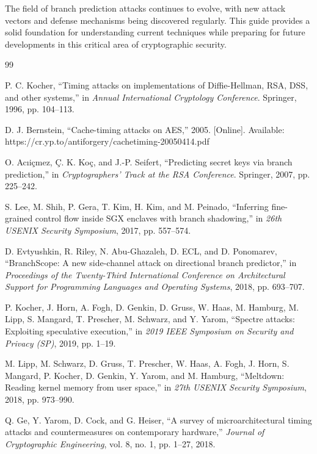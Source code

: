\documentclass[11pt,a4paper]{article}
\theoremstyle{definition}
\begin{document}
The field of branch prediction attacks continues to evolve, with new attack vectors and defense mechanisms being discovered regularly. This guide provides a solid foundation for understanding current techniques while preparing for future developments in this critical area of cryptographic security.

\newpage

\begin{thebibliography}{99}

P. C. Kocher, ``Timing attacks on implementations of Diffie-Hellman, RSA, DSS, and other systems,'' in \textit{Annual International Cryptology Conference}. Springer, 1996, pp. 104--113.

D. J. Bernstein, ``Cache-timing attacks on AES,'' 2005. [Online]. Available: https://cr.yp.to/antiforgery/cachetiming-20050414.pdf

O. Acıiçmez, Ç. K. Koç, and J.-P. Seifert, ``Predicting secret keys via branch prediction,'' in \textit{Cryptographers' Track at the RSA Conference}. Springer, 2007, pp. 225--242.

S. Lee, M. Shih, P. Gera, T. Kim, H. Kim, and M. Peinado, ``Inferring fine-grained control flow inside SGX enclaves with branch shadowing,'' in \textit{26th USENIX Security Symposium}, 2017, pp. 557--574.

D. Evtyushkin, R. Riley, N. Abu-Ghazaleh, D. ECL, and D. Ponomarev, ``BranchScope: A new side-channel attack on directional branch predictor,'' in \textit{Proceedings of the Twenty-Third International Conference on Architectural Support for Programming Languages and Operating Systems}, 2018, pp. 693--707.

P. Kocher, J. Horn, A. Fogh, D. Genkin, D. Gruss, W. Haas, M. Hamburg, M. Lipp, S. Mangard, T. Prescher, M. Schwarz, and Y. Yarom, ``Spectre attacks: Exploiting speculative execution,'' in \textit{2019 IEEE Symposium on Security and Privacy (SP)}, 2019, pp. 1--19.

M. Lipp, M. Schwarz, D. Gruss, T. Prescher, W. Haas, A. Fogh, J. Horn, S. Mangard, P. Kocher, D. Genkin, Y. Yarom, and M. Hamburg, ``Meltdown: Reading kernel memory from user space,'' in \textit{27th USENIX Security Symposium}, 2018, pp. 973--990.

Q. Ge, Y. Yarom, D. Cock, and G. Heiser, ``A survey of microarchitectural timing attacks and countermeasures on contemporary hardware,'' \textit{Journal of Cryptographic Engineering}, vol. 8, no. 1, pp. 1--27, 2018.


\end{thebibliography}
\end{document}
